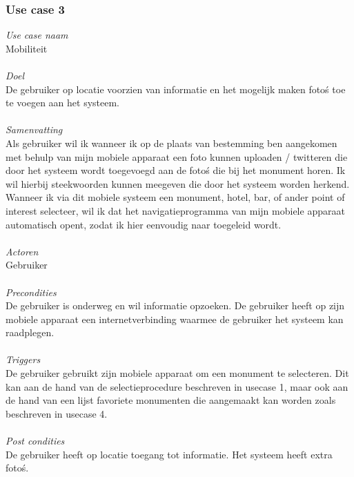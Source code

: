\documentclass[a4paper,10pt]{article}
\begin{document}
			\subsubsection{Use case 3}
			\textit{Use case naam}\\
			Mobiliteit\\ \\
			\textit{Doel}\\
			De gebruiker op locatie voorzien van informatie en het mogelijk maken foto\'s toe te voegen aan het systeem.\\ \\
			\textit{Samenvatting}\\
			Als gebruiker wil ik wanneer ik op de plaats van bestemming ben aangekomen met behulp van mijn mobiele apparaat een foto kunnen uploaden / twitteren die door het systeem wordt toegevoegd aan de foto\'s die bij het monument horen. Ik wil hierbij steekwoorden kunnen meegeven die door het systeem worden herkend. Wanneer ik via dit mobiele systeem een monument, hotel, bar, of ander point of interest selecteer, wil ik dat het navigatieprogramma van mijn mobiele apparaat automatisch opent, zodat ik hier eenvoudig naar toegeleid wordt.\\ \\
			\textit{Actoren}\\
			Gebruiker\\ \\
			\textit{Precondities}\\
			De gebruiker is onderweg en wil informatie opzoeken. De gebruiker heeft op zijn mobiele apparaat een internetverbinding waarmee de gebruiker het systeem kan raadplegen.\\ \\
			\textit{Triggers}\\
			De gebruiker gebruikt zijn mobiele apparaat om een monument te selecteren. Dit kan aan de hand van de selectieprocedure beschreven in usecase 1, maar ook aan de hand van een lijst favoriete monumenten die aangemaakt kan worden zoals beschreven in usecase 4.\\ \\
			\textit{Post condities}\\
			De gebruiker heeft op locatie toegang tot informatie. Het systeem heeft extra foto\'s.	
			
\end{document}
